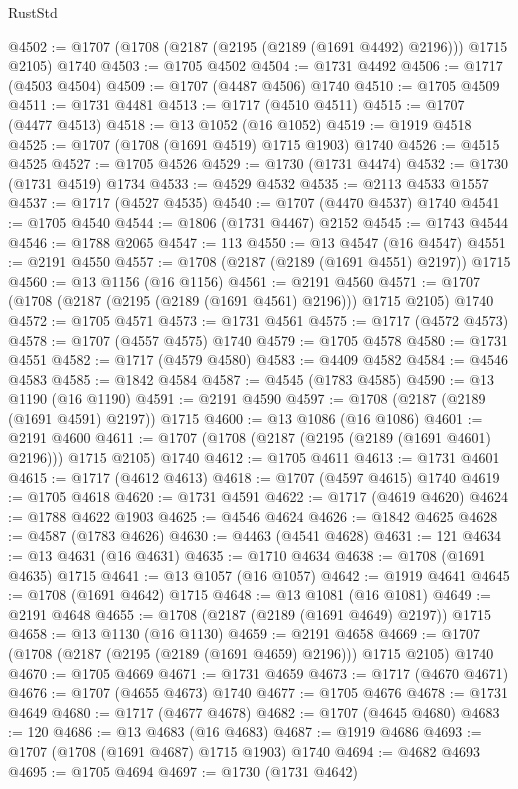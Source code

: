 \begin{lexlean}{RustStd}
\begin{coremodule}
@4502 := @1707 (@1708 (@2187 (@2195 (@2189 (@1691 @4492) @2196))) @1715 @2105) @1740
@4503 := @1705 @4502
@4504 := @1731 @4492
@4506 := @1717 (@4503 @4504)
@4509 := @1707 (@4487 @4506) @1740
@4510 := @1705 @4509
@4511 := @1731 @4481
@4513 := @1717 (@4510 @4511)
@4515 := @1707 (@4477 @4513)
@4518 := @13 @1052 (@16 @1052)
@4519 := @1919 @4518
@4525 := @1707 (@1708 (@1691 @4519) @1715 @1903) @1740
@4526 := @4515 @4525
@4527 := @1705 @4526
@4529 := @1730 (@1731 @4474)
@4532 := @1730 (@1731 @4519) @1734
@4533 := @4529 @4532
@4535 := @2113 @4533 @1557
@4537 := @1717 (@4527 @4535)
@4540 := @1707 (@4470 @4537) @1740
@4541 := @1705 @4540
@4544 := @1806 (@1731 @4467) @2152
@4545 := @1743 @4544
@4546 := @1788 @2065
@4547 := 113
@4550 := @13 @4547 (@16 @4547)
@4551 := @2191 @4550
@4557 := @1708 (@2187 (@2189 (@1691 @4551) @2197)) @1715
@4560 := @13 @1156 (@16 @1156)
@4561 := @2191 @4560
@4571 := @1707 (@1708 (@2187 (@2195 (@2189 (@1691 @4561) @2196))) @1715 @2105) @1740
@4572 := @1705 @4571
@4573 := @1731 @4561
@4575 := @1717 (@4572 @4573)
@4578 := @1707 (@4557 @4575) @1740
@4579 := @1705 @4578
@4580 := @1731 @4551
@4582 := @1717 (@4579 @4580)
@4583 := @4409 @4582
@4584 := @4546 @4583
@4585 := @1842 @4584
@4587 := @4545 (@1783 @4585)
@4590 := @13 @1190 (@16 @1190)
@4591 := @2191 @4590
@4597 := @1708 (@2187 (@2189 (@1691 @4591) @2197)) @1715
@4600 := @13 @1086 (@16 @1086)
@4601 := @2191 @4600
@4611 := @1707 (@1708 (@2187 (@2195 (@2189 (@1691 @4601) @2196))) @1715 @2105) @1740
@4612 := @1705 @4611
@4613 := @1731 @4601
@4615 := @1717 (@4612 @4613)
@4618 := @1707 (@4597 @4615) @1740
@4619 := @1705 @4618
@4620 := @1731 @4591
@4622 := @1717 (@4619 @4620)
@4624 := @1788 @4622 @1903
@4625 := @4546 @4624
@4626 := @1842 @4625
@4628 := @4587 (@1783 @4626)
@4630 := @4463 (@4541 @4628)
@4631 := 121
@4634 := @13 @4631 (@16 @4631)
@4635 := @1710 @4634
@4638 := @1708 (@1691 @4635) @1715
@4641 := @13 @1057 (@16 @1057)
@4642 := @1919 @4641
@4645 := @1708 (@1691 @4642) @1715
@4648 := @13 @1081 (@16 @1081)
@4649 := @2191 @4648
@4655 := @1708 (@2187 (@2189 (@1691 @4649) @2197)) @1715
@4658 := @13 @1130 (@16 @1130)
@4659 := @2191 @4658
@4669 := @1707 (@1708 (@2187 (@2195 (@2189 (@1691 @4659) @2196))) @1715 @2105) @1740
@4670 := @1705 @4669
@4671 := @1731 @4659
@4673 := @1717 (@4670 @4671)
@4676 := @1707 (@4655 @4673) @1740
@4677 := @1705 @4676
@4678 := @1731 @4649
@4680 := @1717 (@4677 @4678)
@4682 := @1707 (@4645 @4680)
@4683 := 120
@4686 := @13 @4683 (@16 @4683)
@4687 := @1919 @4686
@4693 := @1707 (@1708 (@1691 @4687) @1715 @1903) @1740
@4694 := @4682 @4693
@4695 := @1705 @4694
@4697 := @1730 (@1731 @4642)

\end{coremodule}
\end{lexlean}
